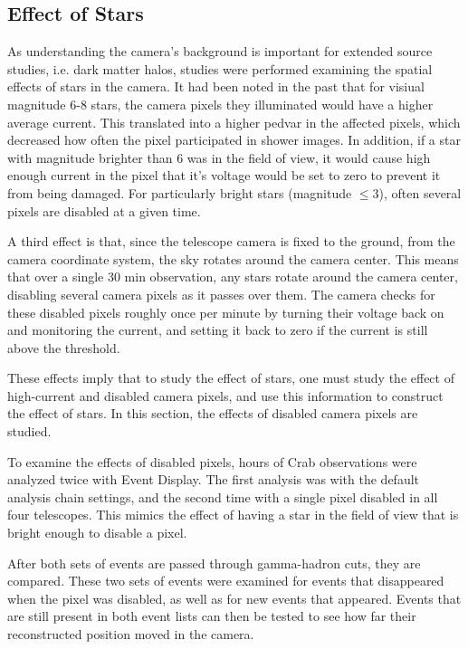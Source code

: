     

  \subsection{Effect of Stars}
    As understanding the camera's background is important for extended source studies, i.e. dark matter halos, studies were performed examining the spatial effects of stars in the camera.
    It had been noted in the past that for visiual magnitude \nicetilde{}6-8 stars, the camera pixels they illuminated would have a higher average current.
    This translated into a higher pedvar in the affected pixels, which decreased how often the pixel participated in shower images.
    In addition, if a star with magnitude brighter than 6 was in the field of view, it would cause high enough current in the pixel that it's voltage would be set to zero to prevent it from being damaged.
    For particularly bright stars (magnitude $\leq{}3$), often several pixels are disabled at a given time.

    A third effect is that, since the telescope camera is fixed to the ground, from the camera coordinate system, the sky rotates around the camera center.
    This means that over a single 30 min observation, any stars rotate around the camera center, disabling several camera pixels as it passes over them.
    The camera checks for these disabled pixels roughly once per minute by turning their voltage back on and monitoring the current, and setting it back to zero if the current is still above the threshold.

    These effects imply that to study the effect of stars, one must study the effect of high-current and disabled camera pixels, and use this information to construct the effect of stars.
    In this section, the effects of disabled camera pixels are studied.

    To examine the effects of disabled pixels,  hours of Crab observations were analyzed twice with Event Display.
    The first analysis was with the default analysis chain settings, and the second time with a single pixel disabled in all four telescopes.
    This mimics the effect of having a star in the field of view that is bright enough to disable a pixel.

    After both sets of events are passed through gamma-hadron cuts, they are compared.
    These two sets of events were examined for events that disappeared when the pixel was disabled, as well as for new events that appeared.
    Events that are still present in both event lists can then be tested to see how far their reconstructed position moved in the camera.

